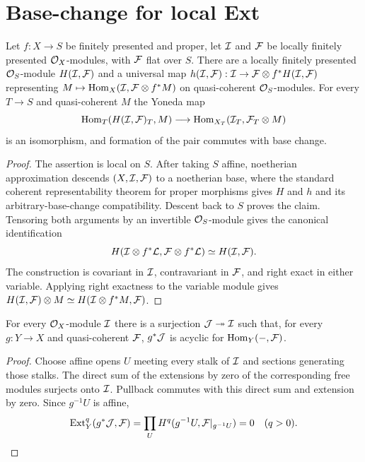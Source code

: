 \section{Base-change for local Ext}

\begin{definition}
\label{akcp-1-1-H}
Let $f:X\to S$ be finitely presented and proper, let $\mathcal I$ and $\mathcal F$ be
locally finitely presented $\mathcal O_X$-modules, with $\mathcal F$ flat over $S$.  There
are a locally finitely presented $\mathcal O_S$-module $H(\mathcal I,\mathcal F)$ and a universal
map $h(\mathcal I,\mathcal F):\mathcal I\to\mathcal F\otimes f^*H(\mathcal I,\mathcal F)$ representing
$M\mapsto\operatorname{Hom}_X(\mathcal I,\mathcal F\otimes f^*M)$ on quasi-coherent $\mathcal O_S$-modules.
For every $T\to S$ and quasi-coherent $M$ the Yoneda map
\[
\operatorname{Hom}_T(H(\mathcal I,\mathcal F)_T,M)\longrightarrow
\operatorname{Hom}_{X_T}(\mathcal I_T,\mathcal F_T\otimes M)
\]
is an isomorphism, and formation of the pair commutes with base change.
\end{definition}

\begin{proof}
The assertion is local on $S$.  After taking $S$ affine, noetherian
approximation descends $(X,\mathcal I,\mathcal F)$ to a noetherian base, where the standard
coherent representability theorem for proper morphisms gives $H$ and $h$ and
its arbitrary-base-change compatibility.  Descent back to $S$ proves the
claim.  Tensoring both arguments by an invertible $\mathcal O_S$-module gives the
canonical identification
\[
H(\mathcal I\otimes f^*\mathcal L,\mathcal F\otimes f^*\mathcal L)\simeq H(\mathcal I,\mathcal F).
\]
The construction is covariant in $\mathcal I$, contravariant in $\mathcal F$, and right
exact in either variable.  Applying right exactness to the variable module
gives $H(\mathcal I,\mathcal F)\otimes M\simeq H(\mathcal I\otimes f^*M,\mathcal F)$.
\end{proof}

\begin{lemma}
\label{akcp-1-2-acyclic-cover}
For every $\mathcal O_X$-module $\mathcal I$ there is a surjection $\mathcal J\twoheadrightarrow\mathcal I$
such that, for every $g:Y\to X$ and quasi-coherent $\mathcal F$, $g^*\mathcal J$ is acyclic
for $\operatorname{Hom}_Y(-,\mathcal F)$.
\end{lemma}
\begin{proof}
Choose affine opens $U$ meeting every stalk of $\mathcal I$ and sections generating
those stalks.  The direct sum of the extensions by zero of the corresponding
free modules surjects onto $\mathcal I$.  Pullback commutes with this direct sum and
extension by zero.  Since $g^{-1}U$ is affine,
\[
\operatorname{Ext}_Y^q(g^*\mathcal J,\mathcal F)=\prod_U H^q(g^{-1}U,\mathcal F|_{g^{-1}U})=0\quad(q>0).
\]
\end{proof}

